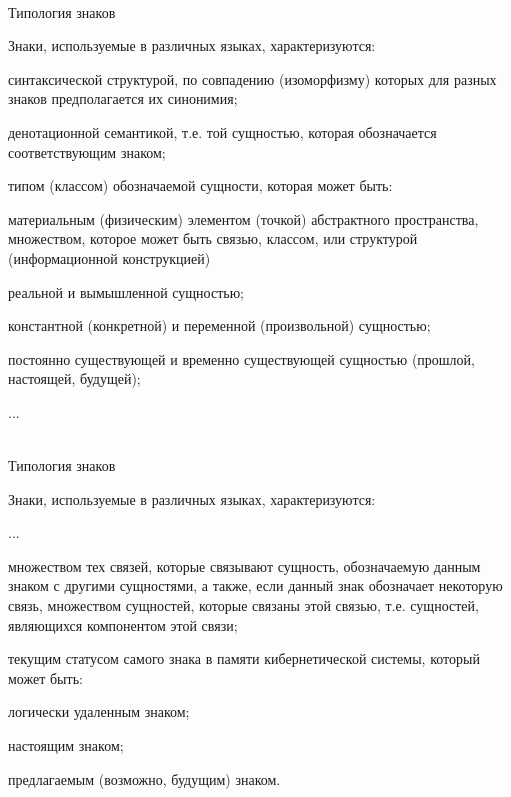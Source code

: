 \begin{frame}{\\Типология знаков}
	\topline
	\justifying
	\small
	
	\vspace{10mm}
	Знаки, используемые в различных языках, характеризуются:
	\begin{textitemize}
		\item синтаксической структурой, по совпадению (изоморфизму)
		которых для разных знаков предполагается их синонимия;
		\item денотационной семантикой, т.е. той сущностью, которая
		обозначается соответствующим знаком;
		\item типом (классом) обозначаемой сущности, которая может
		быть:
		\begin{textitemize}
			\item материальным (физическим) элементом (точкой)
			абстрактного пространства, множеством, которое может быть связью, классом, или структурой (информационной конструкцией)
			\item реальной и вымышленной сущностью;
			\item константной (конкретной) и переменной
			(произвольной) сущностью;
			\item постоянно существующей и временно существующей
			сущностью (прошлой, настоящей, будущей);
		\end{textitemize}
		\item ...
	\end{textitemize}
	
\end{frame}

\begin{frame}{\\Типология знаков}
	\topline
	\justifying
	\small
	
	\vspace{10mm}
	Знаки, используемые в различных языках, характеризуются:
	\begin{textitemize}
		\item ...
		\item множеством тех связей, которые связывают сущность,
		обозначаемую данным знаком с другими сущностями, а также, если данный знак
		обозначает некоторую связь, множеством сущностей, которые связаны этой связью,
		т.е. сущностей, являющихся компонентом этой связи;
		\item текущим статусом самого знака в памяти кибернетической
		системы, который может быть:
		\begin{textitemize}
			\item логически удаленным знаком;
			\item настоящим знаком;
			\item предлагаемым (возможно, будущим) знаком.
		\end{textitemize}
	\end{textitemize}
	
\end{frame}

